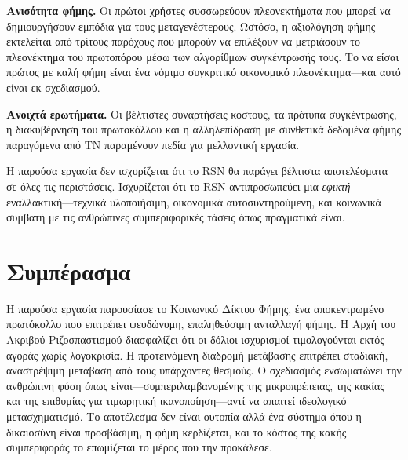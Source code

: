 \documentclass[11pt,a4paper,twocolumn]{article}
\begin{document}
\textbf{Ανισότητα φήμης.} Οι πρώτοι χρήστες συσσωρεύουν πλεονεκτήματα που μπορεί να δημιουργήσουν εμπόδια για τους μεταγενέστερους. Ωστόσο, η αξιολόγηση φήμης εκτελείται από τρίτους παρόχους που μπορούν να επιλέξουν να μετριάσουν το πλεονέκτημα του πρωτοπόρου μέσω των αλγορίθμων συγκέντρωσής τους. Το να είσαι πρώτος με καλή φήμη είναι ένα νόμιμο συγκριτικό οικονομικό πλεονέκτημα---και αυτό είναι εκ σχεδιασμού.

\textbf{Ανοιχτά ερωτήματα.} Οι βέλτιστες συναρτήσεις κόστους, τα πρότυπα συγκέντρωσης, η διακυβέρνηση του πρωτοκόλλου και η αλληλεπίδραση με συνθετικά δεδομένα φήμης παραγόμενα από ΤΝ παραμένουν πεδία για μελλοντική εργασία.

Η παρούσα εργασία δεν ισχυρίζεται ότι το RSN θα παράγει βέλτιστα αποτελέσματα σε όλες τις περιστάσεις. Ισχυρίζεται ότι το RSN αντιπροσωπεύει μια \emph{εφικτή} εναλλακτική---τεχνικά υλοποιήσιμη, οικονομικά αυτοσυντηρούμενη, και κοινωνικά συμβατή με τις ανθρώπινες συμπεριφορικές τάσεις όπως πραγματικά είναι.

\section{Συμπέρασμα}

Η παρούσα εργασία παρουσίασε το Κοινωνικό Δίκτυο Φήμης, ένα αποκεντρωμένο πρωτόκολλο που επιτρέπει ψευδώνυμη, επαληθεύσιμη ανταλλαγή φήμης. Η Αρχή του Ακριβού Ριζοσπαστισμού διασφαλίζει ότι οι δόλιοι ισχυρισμοί τιμολογούνται εκτός αγοράς χωρίς λογοκρισία. Η προτεινόμενη διαδρομή μετάβασης επιτρέπει σταδιακή, αναστρέψιμη μετάβαση από τους υπάρχοντες θεσμούς. Ο σχεδιασμός ενσωματώνει την ανθρώπινη φύση όπως είναι---συμπεριλαμβανομένης της μικροπρέπειας, της κακίας και της επιθυμίας για τιμωρητική ικανοποίηση---αντί να απαιτεί ιδεολογικό μετασχηματισμό. Το αποτέλεσμα δεν είναι ουτοπία αλλά ένα σύστημα όπου η δικαιοσύνη είναι προσβάσιμη, η φήμη κερδίζεται, και το κόστος της κακής συμπεριφοράς το επωμίζεται το μέρος που την προκάλεσε.


\end{document}
